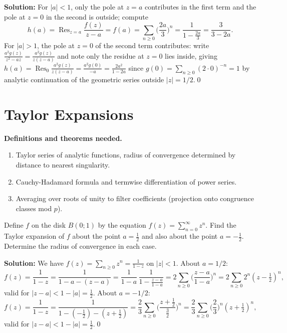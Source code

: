 \bigskip\noindent\textbf{Solution:}
For $|a|<1$, only the pole at $z=a$ contributes in the first term and the pole at $z=0$ in the second is outside; compute
\[h(a)=\operatorname{Res}_{z=a}\frac{f(z)}{z-a}=f(a)=\sum_{n\ge0}\Big(\frac{2a}{3}\Big)^n=\frac{1}{1-\frac{2a}{3}}=\frac{3}{3-2a}.
\]
For $|a|>1$, the pole at $z=0$ of the second term contributes: write $\frac{a^2g(z)}{z^2-az}=\frac{a^2g(z)}{z(z-a)}$ and note only the residue at $z=0$ lies inside, giving $h(a)=\operatorname{Res}_{0}\frac{a^2g(z)}{z(z-a)}=\frac{a^2g(0)}{-a}=\frac{2a^2}{1-2a}$ since $g(0)=\sum_{n\ge0} (2\cdot0)^{-n}=1$ by analytic continuation of the geometric series outside $|z|=1/2$.\qed
\section{Taylor Expansions}

\noindent\textbf{Definitions and theorems needed.}
\begin{enumerate}[label=(\alph*)]
\item Taylor series of analytic functions, radius of convergence determined by distance to nearest singularity.
\item Cauchy-Hadamard formula and termwise differentiation of power series.
\item Averaging over roots of unity to filter coefficients (projection onto congruence classes mod $p$).
\end{enumerate}



\begin{problembox}
Define \( f \) on the disk \( B(0; 1) \) by the equation \( f(z) = \sum_{n=0}^{\infty} z^n \). Find the Taylor expansion of \( f \) about the point \( a = \frac{1}{2} \) and also about the point \( a = -\frac{1}{2} \). Determine the radius of convergence in each case.
\end{problembox}

\bigskip\noindent\textbf{Solution:}
We have $f(z)=\sum_{n\ge0}z^n=\frac{1}{1-z}$ on $|z|<1$. About $a=1/2$:
\[f(z)=\frac{1}{1-z}=\frac{1}{1-a-(z-a)}=\frac{1}{1-a}\,\frac{1}{1-\frac{z-a}{1-a}}=2\sum_{n\ge0}\Big(\frac{z-a}{1-a}\Big)^n=2\sum_{n\ge0}2^n(z-\tfrac12)^n,
\]
valid for $|z-a|<1-|a|=\tfrac12$. About $a=-1/2$:
\[f(z)=\frac{1}{1-z}=\frac{1}{1-(-\tfrac12)-(z+\tfrac12)}=\frac{2}{3}\sum_{n\ge0}\Big(\frac{z+\tfrac12}{\tfrac32}\Big)^n=\frac{2}{3}\sum_{n\ge0}\Big(\frac{2}{3}\Big)^n(z+\tfrac12)^n,
\]
valid for $|z-a|<1-|a|=\tfrac12$.\qed


